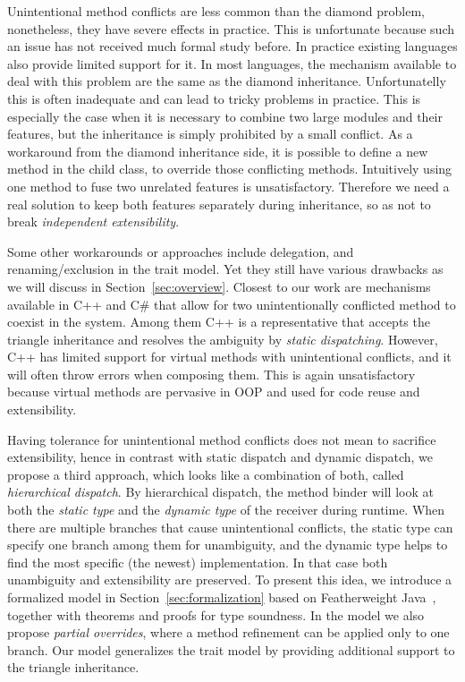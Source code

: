 Unintentional method conflicts are less common than the diamond
problem, nonetheless, they have severe effects in practice. This is
unfortunate because such an issue has not received much formal study 
before. In practice existing languages also provide limited support for
it. In most languages, the mechanism available to deal with this problem are the same as the diamond
inheritance. Unfortunatelly this is often inadequate and can lead 
to tricky problems in practice. This is especially the case
when it is necessary to combine two large modules and their features,
but the inheritance is simply prohibited by a small conflict. As
a workaround from the diamond inheritance side, it is possible to
define a new method in the child class, to override those conflicting
methods. Intuitively using one method to fuse two unrelated features
is unsatisfactory. Therefore we need a real solution to keep both
features separately during inheritance, so as not to break
\emph{independent extensibility}\cite{zenger05independentlyextensible}.

Some other workarounds or approaches include delegation, and
renaming/exclusion in the trait model. Yet they still have various
drawbacks as we will discuss in Section~\ref{sec:overview}. Closest to our work
are mechanisms available in C++ and C\# that allow for two
unintentionally conflicted method to coexist in the system. Among them
C++ is a representative that accepts the triangle inheritance and
resolves the ambiguity by \emph{static dispatching}. However, C++ has
limited support for virtual methods with unintentional conflicts, and
it will often throw errors when composing them. This is again
unsatisfactory because virtual methods are pervasive in OOP and used 
for code reuse and extensibility.

Having tolerance for unintentional method conflicts does not mean to
sacrifice extensibility, hence in contrast with static dispatch and
dynamic dispatch, we propose a third approach, which looks like a
combination of both, called \textit{hierarchical dispatch}. By
hierarchical dispatch, the method binder will look at both the \emph{static
type} and the \emph{dynamic type} of the receiver during runtime. When there
are multiple branches that cause unintentional conflicts, the static
type can specify one branch among them for unambiguity, and the
dynamic type helps to find the most specific (the newest)
implementation. In that case both unambiguity and extensibility are
preserved. To present this idea, we introduce a formalized model in
Section~\ref{sec:formalization} based on Featherweight Java~\cite{Igarashi01FJ}, together with theorems and
proofs for type soundness. In the model we also propose
\textit{partial overrides}, where a method refinement can be applied
only to one branch. Our model generalizes the trait
model by providing additional support to the triangle inheritance.

